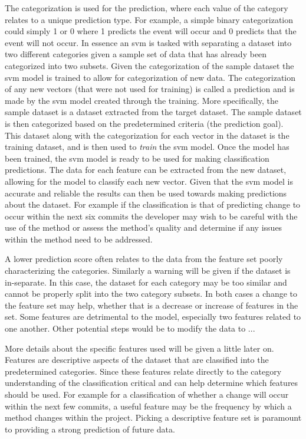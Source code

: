 The categorization is used for the prediction, where each value of the category relates to a unique prediction type. For example, a simple binary categorization could simply 1 or 0 where 1 predicts the event will occur and 0 predicts that the event will not occur. In essence an \gls{svm} is tasked with separating a dataset into two different categories given a sample set of data that has already been categorized into two subsets. Given the categorization of the sample dataset the \gls{svm} model is trained to allow for categorization of new data. The categorization of any new vectors (that were not used for training) is called a prediction and is made by the \gls{svm} model created through the training. More specifically, the sample dataset is a dataset extracted from the target dataset. The sample dataset is then categorized based on the predetermined criteria (the prediction goal). This dataset along with the categorization for each vector in the dataset is the training dataset, and is then used to \textit{train} the \gls{svm} model. Once the model has been trained, the \gls{svm} model is ready to be used for making classification predictions. The data for each feature can be extracted from the new dataset, allowing for the model to classify each new vector. Given that the \gls{svm} model is accurate and reliable the results can then be used towards making predictions about the dataset. For example if the classification is that of predicting change to occur within the next six commits the developer may wish to be careful with the use of the method or assess the method's quality and determine if any issues within the method need to be addressed.

A lower prediction score often relates to the data from the feature set poorly characterizing the categories. Similarly a warning will be given if the dataset is in-separate. In this case, the dataset for each category may be too similar and cannot be properly split into the two category subsets. In both cases a change to the feature set may help, whether that is a decrease or increase of features in the set. Some features are detrimental to the model, especially two features related to one another. Other potential steps would be to modify the data to ...

More details about the specific features used will be given a little later on. Features are descriptive aspects of the dataset that are classified into the predetermined categories. Since these features relate directly to the category understanding of the classification critical and can help determine which features should be used. For example for a classification of whether a change will occur within the next few commits, a useful feature may be the frequency by which a method changes within the project. Picking a descriptive feature set is paramount to providing a strong prediction of future data.

